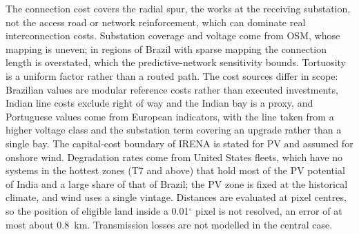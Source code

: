 The connection cost covers the radial spur, the works at the receiving
substation, not the access road or network reinforcement, which can
dominate real interconnection costs. Substation coverage and voltage come
from OSM, whose mapping is uneven; in regions of Brazil with sparse
mapping the connection length is overstated, which the predictive-network
sensitivity bounds. Tortuosity is a uniform factor rather than a routed
path. The cost sources differ in scope: Brazilian values are modular
reference costs rather than executed investments, Indian line costs
exclude right of way and the Indian bay is a proxy, and Portuguese values
come from European indicators, with the line taken from a higher voltage
class and the substation term covering an upgrade rather than a single
bay. The capital-cost
boundary of IRENA is stated for PV and assumed for onshore wind.
Degradation rates come from United States fleets, which have no systems
in the hottest zones (T7 and above) that hold most of the PV potential of
India and a large share of that of Brazil; the PV zone is fixed at the
historical climate, and wind uses a single vintage. Distances are
evaluated at pixel centres, so the position of eligible land inside a
0.01$^\circ$ pixel is not resolved, an error of at most about 0.8~km.
Transmission losses are not modelled in the central case.
